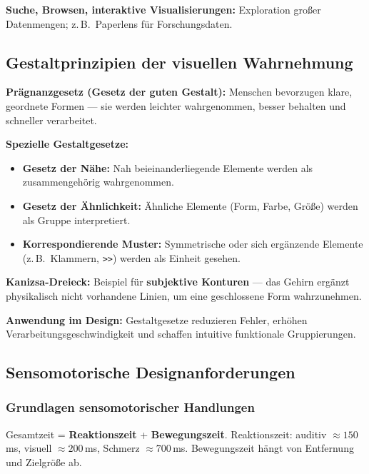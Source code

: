 \documentclass[12pt, a4paper]{article}
\begin{document}
\textbf{Suche, Browsen, interaktive Visualisierungen:} Exploration großer Datenmengen; z.\,B.\ Paperlens für Forschungsdaten.

\subsection{Gestaltprinzipien der visuellen Wahrnehmung}

\textbf{Prägnanzgesetz (Gesetz der guten Gestalt):} Menschen bevorzugen klare, geordnete Formen — sie werden leichter wahrgenommen, besser behalten und schneller verarbeitet.

\textbf{Spezielle Gestaltgesetze:}
\begin{itemize}
  \item \textbf{Gesetz der Nähe:} Nah beieinanderliegende Elemente werden als zusammengehörig wahrgenommen.
  \item \textbf{Gesetz der Ähnlichkeit:} Ähnliche Elemente (Form, Farbe, Größe) werden als Gruppe interpretiert.
  \item \textbf{Korrespondierende Muster:} Symmetrische oder sich ergänzende Elemente (z.\,B.\ Klammern, \texttt{>>}) werden als Einheit gesehen.
\end{itemize}

\textbf{Kanizsa-Dreieck:} Beispiel für \textbf{subjektive Konturen} — das Gehirn ergänzt physikalisch nicht vorhandene Linien, um eine geschlossene Form wahrzunehmen.

\textbf{Anwendung im Design:} Gestaltgesetze reduzieren Fehler, erhöhen Verarbeitungsgeschwindigkeit und schaffen intuitive funktionale Gruppierungen.

\subsection{Sensomotorische Designanforderungen}

\subsubsection*{Grundlagen sensomotorischer Handlungen}

Gesamtzeit = \textbf{Reaktionszeit} + \textbf{Bewegungszeit}. Reaktionszeit: auditiv $\approx 150\,$ms, visuell $\approx 200\,$ms, Schmerz $\approx 700\,$ms. Bewegungszeit hängt von Entfernung und Zielgröße ab.
\end{document}
